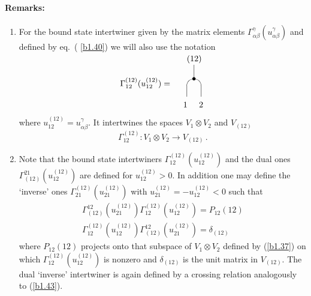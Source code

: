 \documentclass[a4paper,a4paper]{article}
\begin{document}
\paragraph{Remarks:}

\begin{enumerate}
\item  For the bound state intertwiner given by the matrix elements $\Gamma
_{\alpha \beta }^{\gamma }(u_{\alpha \beta }^{\gamma })$ and defined by eq.~(%
\ref{b1.40}) we will also use the notation 
\[
\Gamma _{12}^{(12)}(u_{12}^{(12)})=~ 
\begin{array}{l}
\unitlength3mm\begin{picture}(3,7) \put(2,1.5){\oval(2,5)[t]}
\put(2,4){\line(0,1){2}} \put(2,4){\makebox(0,0){$\bullet$}} \put(.5,0){1}
\put(2.7,0){2} \put(1,6.5){(12)} \end{picture}
\end{array}
\]
where $u_{12}^{(12)}=u_{\alpha \beta }^{\gamma }$. It intertwines the spaces 
$V_{1}\otimes V_{2}$ and $V_{(12)}$ 
\begin{equation}
\Gamma _{12}^{(12)}:V_{1}\otimes V_{2}\rightarrow V_{(12)}\,.  \label{b1.37}
\end{equation}

\item  Note that the bound state intertwiners $\Gamma
_{12}^{(12)}(u_{12}^{(12)})$ and the dual ones $\Gamma
_{(12)}^{21}(u_{12}^{(12)})$ are defined for $u_{12}^{(12)}>0$. In addition
one may define the `inverse' ones $\Gamma _{21}^{(12)}(u_{21}^{(12)})$ with $%
u_{21}^{(12)}=-u_{12}^{(12)}<0$ such that 
\begin{eqnarray}
\Gamma _{(12)}^{12}(u_{21}^{(12)})\Gamma
_{12}^{(12)}(u_{12}^{(12)})=P_{12}(12)  \nonumber \\
\Gamma _{12}^{(12)}(u_{12}^{(12)})\Gamma _{(12)}^{12}(u_{21}^{(12)})=\delta
_{(12)}  \label{b1.52}
\end{eqnarray}
where $P_{12}(12)$ projects onto that subspace of $V_{1}\otimes V_{2}$
defined by (\ref{b1.37}) on which $\Gamma _{12}^{(12)}(u_{12}^{(12)})$ is
nonzero and $\delta _{(12)}$ is the unit matrix in $V_{(12)}$. The dual
`inverse' intertwiner is again defined by a crossing relation analogously to
(\ref{b1.43}).


\end{enumerate}
\end{document}
